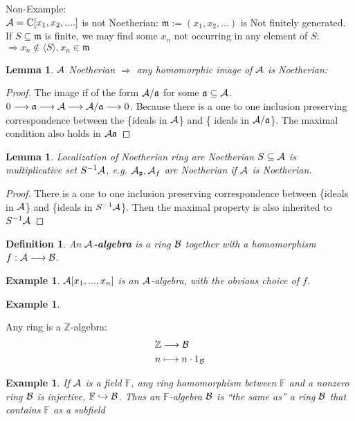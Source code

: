 \documentclass[11pt]{article}
\newtheorem{lemma}[thm]{Lemma}
\newtheorem{dfn}[thm]{Definition}
\newtheorem{ex}[thm]{Example}
\newcommand{\cplx}{\mathbb C}
\newcommand{\intg}{\mathbb Z}
\newcommand{\bbf}{\mathbb F}
\newcommand{\sca}{{\mathfrak a}}
\newcommand{\scm}{{\mathfrak m}}
\newcommand{\scp}{{\mathfrak p}}
\newcommand{\cala}{{\cal A}}
\newcommand{\calb}{{\cal B}}
\newcommand{\Lrta}{\Longrightarrow}
\newcommand{\lrta}{\longrightarrow}
\newcommand{\lgl}{\langle}
\newcommand{\rgl}{\rangle}
\newcommand{\inj}{\hookrightarrow}
\begin{document}
Non-Example:\\
$\cala=\cplx[x_1,x_2,....]$ is not Noetherian: $\scm:=(x_1,x_2,...)$ is Not finitely generated. If $S\subseteq \scm$ is finite, we may find some $x_n$ not occurring in any element of $S$: $\Lrta x_n\notin \lgl S\rgl, x_n\in \scm$

\begin{lemma}
$\cala$ Noetherian
$\Lrta$ any homomorphic image of $\cala$ is Noetherian:
\end{lemma}
\begin{proof}
The image if of the form $\cala/\sca$ for some $\sca\subseteq \cala$.
$0\lrta \sca\lrta \cala\lrta \cala/\sca\lrta 0$. Because there is a one to one inclusion preserving  correspondence between the \{ideals in $\cala$\} and \{ ideals in $\cala/\sca$\}. The maximal condition also holds in $\cala\sca$
\end{proof}
\begin{lemma}
Localization of  Noetherian ring are Noetherian $S\subseteq \cala$ is multiplicative set $S^{-1}\cala$, e.g. $\cala_\scp,\cala_f$ are Noetherian if $\cala$ is Noetherian.
\end{lemma}
\begin{proof}
There is a one to one inclusion preserving correspondence between \{ideals in $\cala$\} and \{ideals in $S^{-1}\cala$\}. Then the maximal property is also inherited to $S^{-1}\cala$ 
\end{proof}

\begin{dfn}
An \textbf{$\cala$-algebra } is a ring $\calb$ together with a homomorphism $f:\cala\lrta \calb$.
\end{dfn}

\begin{ex}
$\cala[x_1,...,x_n]$ is an $\cala$-algebra, with the obvious choice of $f$.
\end{ex}
\begin{ex}

\end{ex}Any ring is a $\intg$-algebra:
$$
\begin{aligned}
&\intg \lrta \calb\\
&n\longmapsto n \cdot 1_\calb
\end{aligned}
$$
\begin{ex}
If $\cala$ is a field $\bbf$, any ring homomorphism between $\bbf$ and a nonzero ring $\calb$ is injective, $\bbf\inj \calb$. Thus an $\bbf$-algebra $\calb$ is ``the same as'' a ring $\calb$ that contains $\bbf$ as a subfield
\end{ex}
\end{document}
